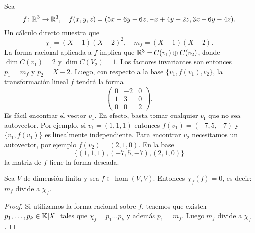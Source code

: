 \begin{example}
	Sea
	\[
		f\colon\mathbb{R}^3\to\mathbb{R}^3,\quad
		f(x,y,z)=(5x-6y-6z,-x+4y+2z,3x-6y-4z).
	\]
	Un cálculo directo muestra que 
	\[
	\chi_f=(X-1)(X-2)^2,\quad
	m_f=(X-1)(X-2).
	\]
	La forma racional aplicada a $f$ implica que $\mathbb{R}^3=C(v_1)\oplus C(v_2)$, donde
	$\dim C(v_1)=2$ y $\dim C(V_2)=1$. Los factores invariantes son entonces
	$p_1=m_f$ y $p_2=X-2$. Luego, con respecto a la base $\{v_1,f(v_1),v_2\}$,
	la transformación lineal $f$ tendrá la forma
	\[
		\begin{pmatrix}
			0 & -2 & 0\\
			1 & 3 & 0\\
			0 & 0 & 2
		\end{pmatrix}.
	\]
	Es fácil encontrar el vector $v_1$. En efecto, basta tomar cualquier $v_1$
	que no sea autovector. Por ejemplo, si $v_1=(1,1,1)$ entonces
	$f(v_1)=(-7,5,-7)$ y $\{v_1,f(v_1)\}$ es linealmente independiente. Para
	encontrar $v_2$ necesitamos un autovector, por ejemplo $f(v_2)=(2,1,0)$. En
	la base \[
		\{(1,1,1),(-7,5,-7),(2,1,0)\}
	\]
	la matriz de $f$ tiene la forma
	deseada. 
\end{example}

\begin{cor}
	\label{thm:CayleyHamilton}
    Sea $V$ de dimensión finita y sea $f\in\hom(V,V)$. Entonces $\chi_f(f)=0$,
    es decir: $m_f$ divide a $\chi_f$. 

    \begin{proof}
        Si utilizamos la forma racional sobre $f$, tenemos que existen
        $p_1,\dots,p_k\in\mathbb{K}[X]$ tales que $\chi_f=p_1\dots p_k$ y además
        $p_1=m_f$. Luego $m_f$ divide a $\chi_f$.
    \end{proof}
\end{cor}


